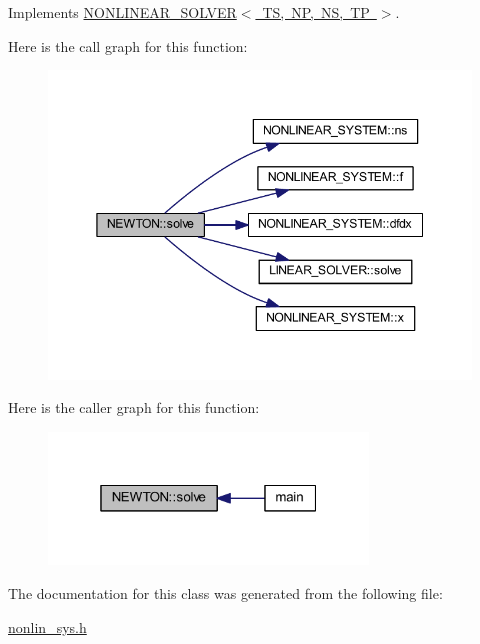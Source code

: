 Implements \mbox{\hyperlink{class_n_o_n_l_i_n_e_a_r___s_o_l_v_e_r_aae333fb75e2d5d8baa0e37991bfac7c4}{N\+O\+N\+L\+I\+N\+E\+A\+R\+\_\+\+S\+O\+L\+V\+E\+R$<$ T\+S, N\+P, N\+S, T\+P $>$}}.

Here is the call graph for this function\+:\nopagebreak
\begin{figure}[H]
\begin{center}
\leavevmode
\includegraphics[width=345pt]{class_n_e_w_t_o_n_a1dd31b882567d3e0427eb53ce169f0ce_cgraph}
\end{center}
\end{figure}
Here is the caller graph for this function\+:\nopagebreak
\begin{figure}[H]
\begin{center}
\leavevmode
\includegraphics[width=241pt]{class_n_e_w_t_o_n_a1dd31b882567d3e0427eb53ce169f0ce_icgraph}
\end{center}
\end{figure}


The documentation for this class was generated from the following file\+:\begin{DoxyCompactItemize}
\item 
\mbox{\hyperlink{nonlin__sys_8h}{nonlin\+\_\+sys.\+h}}\end{DoxyCompactItemize}
